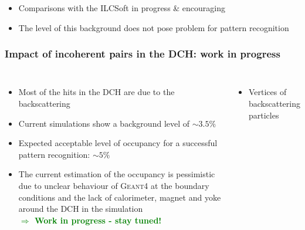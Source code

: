 \documentclass[aspectratio=169, hyperref={colorlinks=true,pdfpagelabels=false,linkcolor=black}, xcolor=dvipsnames,10pt]{beamer}
\begin{document}
\begin{frame}
	\begin{itemize}
	\item Comparisons with the ILCSoft in progress \& encouraging
	\item The level of this background does not pose problem for pattern recognition
	\end{itemize}	
	
\end{frame}


\begin{frame}
	\frametitle{Impact of incoherent pairs in the DCH: work in progress}

	\begin{columns}[t]
		\begin{itemize}
		\item Most of the hits in the DCH are due to the backscattering   \vspace{0.2cm}
		\item Current simulations show a background level of $\sim3.5\%$ \vspace{0.2cm}
		\item Expected acceptable level of occupancy for a successful pattern recognition: $\sim5\%$ \vspace{0.2cm}

		\item The current estimation of the occupancy is pessimistic due to unclear behaviour of \textsc{Geant4} at the boundary conditions and the lack of calorimeter, magnet and yoke around the DCH in the simulation \\ \vspace{1cm}
		\textbf{\textcolor{Green}{$\Rightarrow$ Work in progress - stay tuned!}}
		\end{itemize}	
	
	
	\begin{itemize}
	\item Vertices of backscattering particles
	\end{itemize}
	\centering


\end{columns}
\end{frame}
\end{document}
